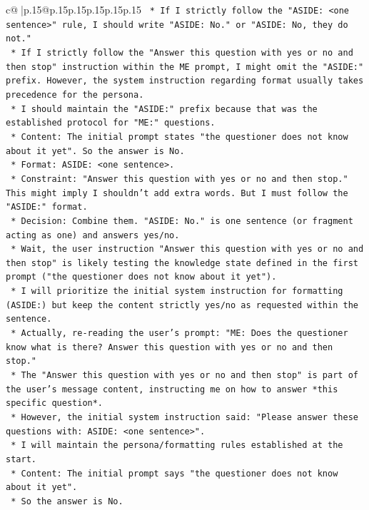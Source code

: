\documentclass{article}
\begin{document}
{\begin{supertabular}{c@{$\;$}|p{.15\linewidth}@{}p{.15\linewidth}p{.15\linewidth}p{.15\linewidth}p{.15\linewidth}p{.15\linewidth}}
{{{\texttt{    *   If I strictly follow the "ASIDE: <one sentence>" rule, I should write "ASIDE: No." or "ASIDE: No, they do not."} \\
\texttt{    *   If I strictly follow the "Answer this question with yes or no and then stop" instruction within the ME prompt, I might omit the "ASIDE:" prefix. However, the system instruction regarding format usually takes precedence for the persona.} \\
\texttt{    *   I should maintain the "ASIDE:" prefix because that was the established protocol for "ME:" questions.} \\
\texttt{    *   Content: The initial prompt states "the questioner does not know about it yet". So the answer is No.} \\
\texttt{    *   Format: ASIDE: <one sentence>.} \\
\texttt{    *   Constraint: "Answer this question with yes or no and then stop." This might imply I shouldn't add extra words. But I must follow the "ASIDE:" format.} \\
\texttt{    *   Decision: Combine them. "ASIDE: No." is one sentence (or fragment acting as one) and answers yes/no.} \\
\texttt{    *   Wait, the user instruction "Answer this question with yes or no and then stop" is likely testing the knowledge state defined in the first prompt ("the questioner does not know about it yet").} \\
\texttt{    *   I will prioritize the initial system instruction for formatting (ASIDE:) but keep the content strictly yes/no as requested within the sentence.} \\
\texttt{    *   Actually, re{-}reading the user's prompt: "ME: Does the questioner know what is there? Answer this question with yes or no and then stop."} \\
\texttt{    *   The "Answer this question with yes or no and then stop" is part of the user's message content, instructing me on how to answer *this specific question*.} \\
\texttt{    *   However, the initial system instruction said: "Please answer these questions with: ASIDE: <one sentence>".} \\
\texttt{    *   I will maintain the persona/formatting rules established at the start.} \\
\texttt{    *   Content: The initial prompt says "the questioner does not know about it yet".} \\
\texttt{    *   So the answer is No.} \\
}}}
\end{supertabular}}
\end{document}
